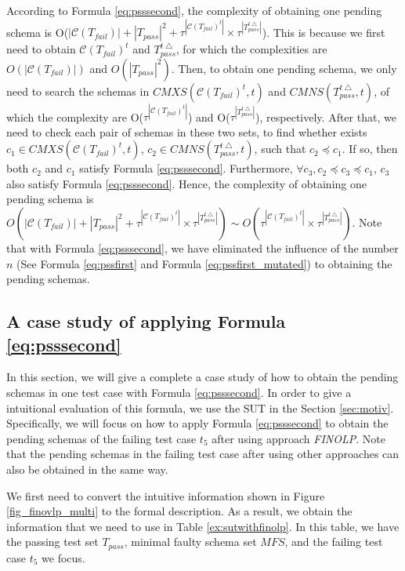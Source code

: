 {According to Formula \ref{eq:psssecond}, the complexity of obtaining one pending schema is O($|\mathcal{C}(T_{fail})| + |T_{pass}|^{2} + \tau^{|\mathcal{C}(T_{fail})^{t}|} \times \tau^{|T_{pass}^{t\bigtriangleup}|}$). This is because we first need to obtain $\mathcal{C}(T_{fail})^{t}$ and $T_{pass}^{t\bigtriangleup}$, for which the complexities are $O(|\mathcal{C}(T_{fail})|)$ and $O(|T_{pass}|^{2})$. Then, to obtain one pending schema, we only need to search the schemas in $CMXS(\mathcal{C}(T_{fail})^{t}, t)$ and $CMNS(T_{pass}^{t\bigtriangleup}, t)$, of which the complexity are O($\tau^{|\mathcal{C}(T_{fail})^{t}|}$) and O($\tau^{|T_{pass}^{t\bigtriangleup}|}$), respectively. After that, we need to check each pair of schemas in these two sets, to find whether exists $c_{1} \in CMXS(\mathcal{C}(T_{fail})^{t}, t)$, $c_{2} \in CMNS(T_{pass}^{t\bigtriangleup}, t)$, such that $c_{2} \preceq c_{1}$. If so, then both $c_{2}$ and $c_{1}$ satisfy Formula \ref{eq:psssecond}. Furthermore, $\forall c_{3}, c_{2} \preceq c_{3} \preceq c_{1}$, $c_{3}$ also satisfy Formula \ref{eq:psssecond}. Hence, the complexity of obtaining one pending schema is $O(|\mathcal{C}(T_{fail})| + |T_{pass}|^{2} + \tau^{|\mathcal{C}(T_{fail})^{t}|} \times \tau^{|T_{pass}^{t\bigtriangleup}|})  \sim O( \tau^{|\mathcal{C}(T_{fail})^{t}|} \times \tau^{|T_{pass}^{t\bigtriangleup}|}) $. Note that with Formula \ref{eq:psssecond}, we have eliminated the influence of the number $n$ (See Formula \ref{eq:pssfirst} and Formula \ref{eq:pssfirst_mutated}) to obtaining the pending schemas.

\subsection{A case study of applying Formula \ref{eq:psssecond} }
In this section, we will give a complete a case study of how to obtain the pending schemas in one test case with Formula \ref{eq:psssecond}. In order to give a intuitional evaluation of this formula, we use the SUT in the Section \ref{sec:motiv}. Specifically, we will focus on  how to apply Formula  \ref{eq:psssecond} to obtain the pending schemas of the failing test case $t_{5}$ after using approach \emph{FINOLP}. Note that the pending schemas in the failing test case after using other approaches can also be obtained in the same way.

We first need to convert the intuitive information shown in Figure \ref{fig_finovlp_multi} to the formal description. As a result, we obtain the information that we need to use in Table \ref{ex:sutwithfinolp}. In this table, we have the passing test set $T_{pass}$, minimal faulty schema set $MFS$, and the failing test case $t_{5}$ we focus.


}
